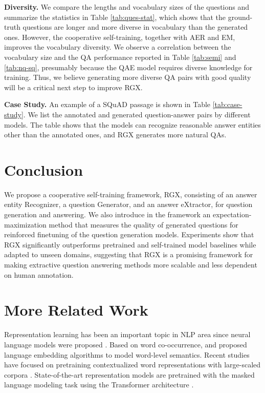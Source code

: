 \documentclass[11pt,a4paper]{article}
\begin{document}
\noindent \textbf{Diversity.}
We compare the lengths and vocabulary sizes of the questions and summarize the statistics in Table \ref{tab:ques-stat}, which shows that the ground-truth questions are longer and more diverse in vocabulary than the generated ones. However, the cooperative self-training, together with AER and EM, improves the vocabulary diversity.
We observe a correlation between the vocabulary size and the QA performance reported in Table \ref{tab:semi} and \ref{tab:nq-sq}, presumably because the QAE model requires diverse knowledge for training. Thus, we believe generating more diverse QA pairs with good quality will be a critical next step to improve RGX.






\noindent \textbf{Case Study.} An example of a SQuAD passage is shown in Table \ref{tab:case-study}. We list the annotated and generated question-answer pairs by different models. The table shows that the models can recognize reasonable answer entities other than the annotated ones, and RGX generates more natural QAs.




\section{Conclusion}
We propose a cooperative self-training framework, RGX, consisting of an answer entity Recognizer, a question Generator, and an answer eXtractor, for question generation and answering. We also introduce in the framework an expectation-maximization method that measures the quality of generated questions for reinforced finetuning of the question generation models. Experiments show that RGX significantly outperforms pretrained and self-trained model baselines while adapted to unseen domains, suggesting that RGX is a promising framework for making extractive question answering methods more scalable and less dependent on human annotation.






\newpage
\appendix

\section{More Related Work}
\label{sec:rw}
Representation learning has been an important topic in NLP area since neural language models were proposed \cite{bengio2003neural}. Based on word co-occurrence, \citet{mikolov2013distributed} and \citet{pennington2014glove} proposed language embedding algorithms to model word-level semantics. Recent studies have focused on pretraining contextualized word representations with large-scaled corpora \cite{peters2018deep}. State-of-the-art representation models are pretrained with the masked language modeling task \cite{devlin2018bert,liu2019roberta,clark2019electra} using the Transformer architecture \cite{vaswani2017attention}.
\end{document}
